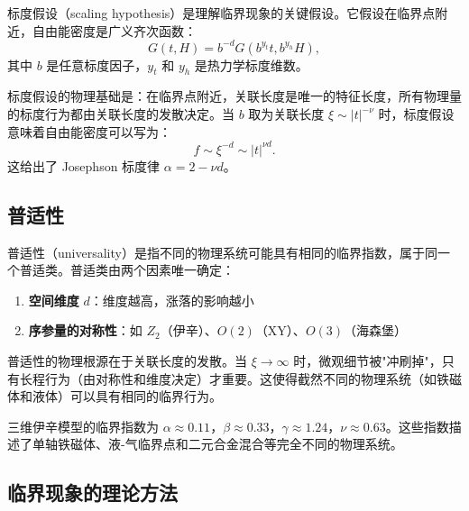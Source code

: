 \begin{definition}[标度假设]
标度假设（scaling hypothesis）是理解临界现象的关键假设。它假设在临界点附近，自由能密度是广义齐次函数：
\begin{equation}
    G(t, H) = b^{-d} G(b^{y_t} t, b^{y_h} H),
\end{equation}
其中 $b$ 是任意标度因子，$y_t$ 和 $y_h$ 是热力学标度维数。
\end{definition}

\begin{remark}
标度假设的物理基础是：在临界点附近，关联长度是唯一的特征长度，所有物理量的标度行为都由关联长度的发散决定。当 $b$ 取为关联长度 $\xi \sim |t|^{-\nu}$ 时，标度假设意味着自由能密度可以写为：
\begin{equation}
    f \sim \xi^{-d} \sim |t|^{\nu d}.
\end{equation}
这给出了 Josephson 标度律 $\alpha = 2 - \nu d$。
\end{remark}

\subsection{普适性}

\begin{definition}[普适性与普适类]
普适性（universality）是指不同的物理系统可能具有相同的临界指数，属于同一个普适类。普适类由两个因素唯一确定：
\begin{enumerate}
    \item \textbf{空间维度} $d$：维度越高，涨落的影响越小
    \item \textbf{序参量的对称性}：如 $Z_2$（伊辛）、$O(2)$（XY）、$O(3)$（海森堡）
\end{enumerate}
\end{definition}

\begin{remark}
普适性的物理根源在于关联长度的发散。当 $\xi \to \infty$ 时，微观细节被"冲刷掉"，只有长程行为（由对称性和维度决定）才重要。这使得截然不同的物理系统（如铁磁体和液体）可以具有相同的临界行为。
\end{remark}

\begin{example}
三维伊辛模型的临界指数为 $\alpha \approx 0.11$，$\beta \approx 0.33$，$\gamma \approx 1.24$，$\nu \approx 0.63$。这些指数描述了单轴铁磁体、液-气临界点和二元合金混合等完全不同的物理系统。
\end{example}

\subsection{临界现象的理论方法}

